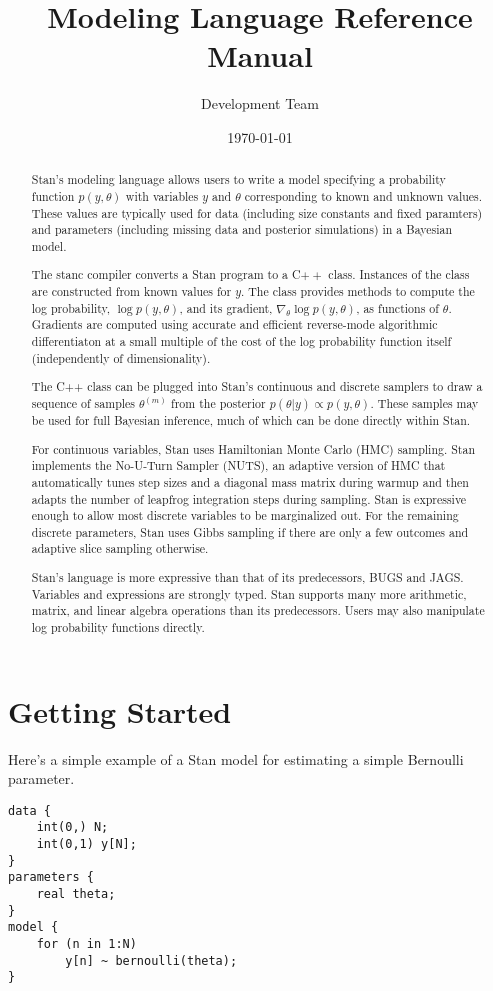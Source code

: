\documentclass[11pt]{report}
\title{\Stan Modeling Language Reference Manual}
\author{\Stan Development Team}
\date{\footnotesize \today}
\newcommand{\Stan}{Stan\xspace}
\newcommand*{\Cpp}{C{\ensuremath{++}}\xspace}
\begin{document}
\maketitle

\begin{abstract}
  \Stan's modeling language allows users to write a model specifying a
  probability function $p(y,\theta)$ with variables $y$ and $\theta$
  corresponding to known and unknown values.  These values are
  typically used for data (including size constants and fixed
  paramters) and parameters (including missing data and posterior
  simulations) in a Bayesian model.

  The stanc compiler converts a Stan program to a \Cpp class.
  Instances of the class are constructed from known values for
  $y$.  The class provides methods to compute the log probability,
  $\log p(y,\theta)$, and its gradient, $\nabla_{\theta} \log
  p(y,\theta)$, as functions of $\theta$.  Gradients are computed using
  accurate and efficient reverse-mode algorithmic differentiaton at a
  small multiple of the cost of the log probability function itself
  (independently of dimensionality).
  
  The C++ class can be plugged into Stan's continuous and discrete
  samplers to draw a sequence of samples $\theta^{(m)}$ from the
  posterior $p(\theta|y) \propto p(y,\theta)$.  These samples may be
  used for full Bayesian inference, much of which can be done directly
  within Stan.

  For continuous variables, Stan uses Hamiltonian Monte Carlo (HMC)
  sampling.  Stan implements the No-U-Turn Sampler (NUTS), an adaptive
  version of HMC that automatically tunes step sizes and a diagonal
  mass matrix during warmup and then adapts the number of leapfrog
  integration steps during sampling.  Stan is expressive enough to
  allow most discrete variables to be marginalized out.  For the remaining
  discrete parameters, Stan uses Gibbs sampling if there are only a few
  outcomes and adaptive slice sampling otherwise.

  Stan's language is more expressive than that of its predecessors,
  BUGS and JAGS.  Variables and expressions are strongly typed.  Stan
  supports many more arithmetic, matrix, and linear algebra operations
  than its predecessors.  Users may also manipulate log probability
  functions directly.

\end{abstract}

\chapter{Getting Started}

Here's a simple example of a Stan model for estimating a simple
Bernoulli parameter.

{\footnotesize
\begin{verbatim}
data {
    int(0,) N;
    int(0,1) y[N];
}
parameters {
    real theta;
}
model {
    for (n in 1:N)
        y[n] ~ bernoulli(theta);
}
\end{verbatim}}
\end{document}
